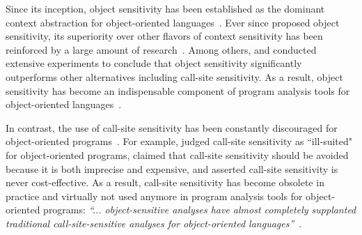 Since its inception, object sensitivity has been established as the
dominant context abstraction for object-oriented
languages~\cite{Smaragdakis2015}.  Ever since \cite{Milanova2002,
  Milanova2005} proposed object sensitivity, its superiority over
other flavors of context sensitivity has been reinforced by a large
amount of 
research~\cite{Lhotak2008,BravenboerS09,Smaragdakis2011,TanLX16,
  JeJeChOh17,Lu:2019:PYF}.  Among others, \cite{Lhotak2006} and
\cite{BravenboerS09} conducted extensive experiments to conclude
that object sensitivity significantly outperforms other alternatives
including call-site sensitivity.  As a result, object sensitivity has
become an indispensable component of program analysis tools for
object-oriented languages~\cite{Fink2008,Zhang2014,NaikAW06,GordonKPGNR_NDSS15,Feng2014,vfix2019}.


In contrast, the use of call-site sensitivity has been constantly
discouraged for object-oriented
programs~\cite{TanLX16,JeJeChOh17,Li2018a,Lhotak2006,
  Smaragdakis2011, Smaragdakis2014, Milanova2002, Milanova2005}.  For
example, \cite{Milanova2002, Milanova2005} judged call-site
sensitivity as ``ill-suited" for object-oriented programs,
\cite{KastrinisS13a} claimed that call-site sensitivity should be
avoided because it is both imprecise and expensive, and
\cite{Smaragdakis2014} asserted call-site sensitivity is never
cost-effective. %
As a result, call-site sensitivity has become obsolete in practice and
virtually not used anymore in program analysis tools for
object-oriented programs: 
\textit{``... object-sensitive analyses have
  almost completely supplanted traditional call-site-sensitive
  analyses for object-oriented languages''}~\cite{Smaragdakis2011}.


